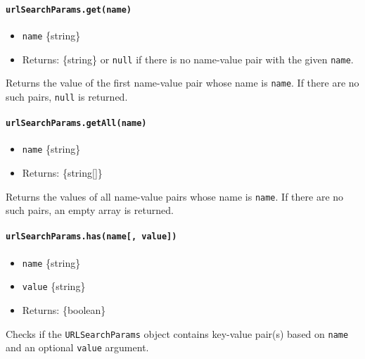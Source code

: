 \paragraph{\texorpdfstring{\texttt{urlSearchParams.get(name)}}{urlSearchParams.get(name)}}\label{urlsearchparams.getname}

\begin{itemize}
\tightlist
\item
  \texttt{name} \{string\}
\item
  Returns: \{string\} or \texttt{null} if there is no name-value pair
  with the given \texttt{name}.
\end{itemize}

Returns the value of the first name-value pair whose name is
\texttt{name}. If there are no such pairs, \texttt{null} is returned.

\paragraph{\texorpdfstring{\texttt{urlSearchParams.getAll(name)}}{urlSearchParams.getAll(name)}}\label{urlsearchparams.getallname}

\begin{itemize}
\tightlist
\item
  \texttt{name} \{string\}
\item
  Returns: \{string{[}{]}\}
\end{itemize}

Returns the values of all name-value pairs whose name is \texttt{name}.
If there are no such pairs, an empty array is returned.

\paragraph{\texorpdfstring{\texttt{urlSearchParams.has(name{[},\ value{]})}}{urlSearchParams.has(name{[}, value{]})}}\label{urlsearchparams.hasname-value}

\begin{itemize}
\tightlist
\item
  \texttt{name} \{string\}
\item
  \texttt{value} \{string\}
\item
  Returns: \{boolean\}
\end{itemize}

Checks if the \texttt{URLSearchParams} object contains key-value pair(s)
based on \texttt{name} and an optional \texttt{value} argument.

